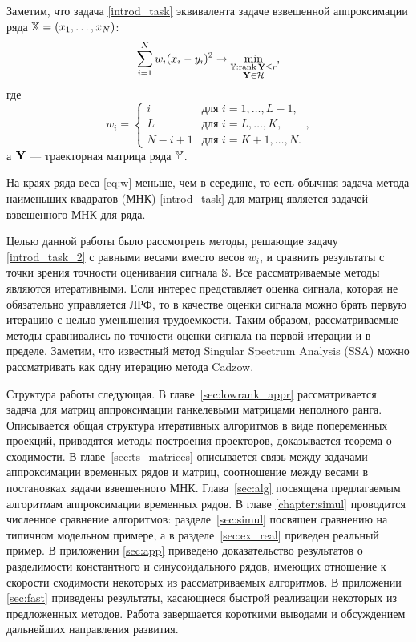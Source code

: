 \documentclass[12pt, specialist, subf,href,colorlinks=true,substylefile = spbu.rtx]{disser}
\def\rank{\mathop{\mathrm{rank}}}
\theoremstyle{remark}
\theoremstyle{definition}
\begin{document}
Заметим, что задача \eqref{introd_task} эквивалента задаче взвешенной аппроксимации ряда $\mathbb{X} = (x_1, \ldots, x_N)$:
\begin{equation}\label{introd_task_2}
\sum_{i = 1}^N w_i(x_i - y_i)^2 \to \min_{\substack{\tsY: \rank \bfY \le r \\ \bfY \in \calH}},
\end{equation}
где
\begin{equation}
\label{eq:w}
w_i = \begin{cases}
i & \text{для $i = 1, \ldots, L-1,$}\\
L & \text{для $i = L, \ldots, K,$}\\
N - i + 1 & \text{для $i = K + 1, \ldots, N.$}
\end{cases},
\end{equation}
а $\mathbf{Y}$ --- траекторная матрица ряда $\mathbb{Y}$.

На краях ряда веса \eqref{eq:w} меньше, чем в середине, то есть обычная задача метода наименьших квадратов (МНК) \eqref{introd_task} для матриц является задачей взвешенного МНК для ряда.

Целью данной работы было рассмотреть методы, решающие задачу \eqref{introd_task_2} с равными весами вместо весов $w_i$, и сравнить результаты с точки зрения точности оценивания сигнала $\mathbb{S}$. Все рассматриваемые методы являются итеративными. Если интерес представляет оценка сигнала, которая не обязательно управляется ЛРФ, то в качестве оценки сигнала можно брать первую итерацию с целью уменьшения трудоемкости. Таким образом, рассматриваемые методы сравнивались по точности оценки сигнала на первой итерации и в пределе. Заметим, что известный метод Singular Spectrum Analysis (SSA) \cite{Broomhead.King1986, Vautard.etal1992, Elsner.Tsonis1996, Golyandina.etal2001, Ghil.etal2002, Golyandina.Zhigljavsky2012} можно
рассматривать как одну итерацию метода Cadzow.

Структура работы следующая.  В главе~\ref{sec:lowrank_appr} рассматривается задача для матриц аппроксимации ганкелевыми матрицами неполного ранга.
Описывается общая структура итеративных алгоритмов в виде попеременных проекций, приводятся методы построения проекторов, доказывается теорема о сходимости.
В главе~\ref{sec:ts_matrices} описывается связь между задачами аппроксимации временных рядов и матриц, соотношение между весами в постановках задачи
взвешенного МНК. Глава~\ref{sec:alg} посвящена предлагаемым алгоритмам аппроксимации временных рядов. В главе \ref{chapter:simul} проводится численное сравнение алгоритмов: разделе~\ref{sec:simul} посвящен сравнению на типичном модельном примере, а в разделе~\ref{sec:ex_real} приведен реальный пример.
В приложении \ref{sec:app} приведено доказательство результатов
о разделимости константного и синусоидального рядов, имеющих отношение к скорости сходимости некоторых из рассматриваемых алгоритмов. В приложении \ref{sec:fast} приведены результаты, касающиеся быстрой реализации некоторых из предложенных методов. Работа завершается короткими выводами и обсуждением дальнейших направления развития.
\end{document}
